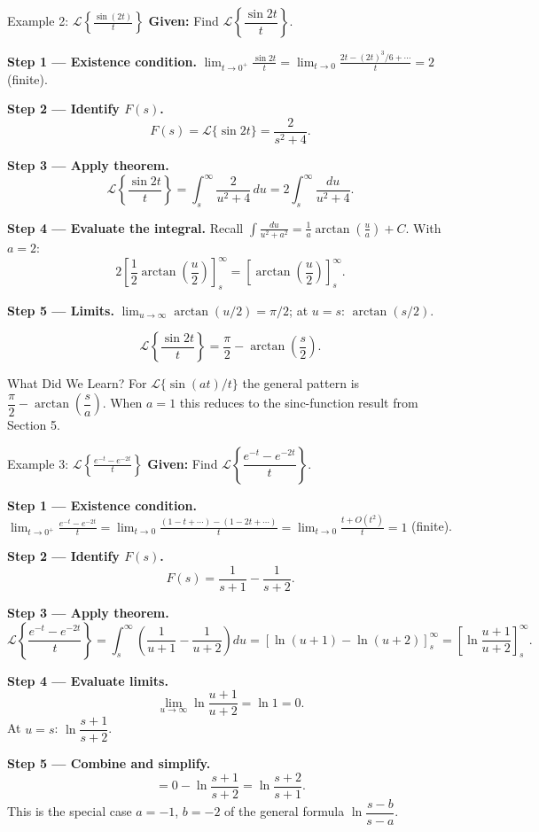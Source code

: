 \documentclass[12pt,a4paper]{article}
\begin{document}
\begin{infobox}{Example 2: $\mathcal{L}\!\left\{\frac{\sin(2t)}{t}\right\}$}
\textbf{Given:} Find $\mathcal{L}\!\left\{\dfrac{\sin 2t}{t}\right\}$.

\textbf{Step 1 --- Existence condition.}
$\displaystyle\lim_{t\to 0^+}\frac{\sin 2t}{t}
= \lim_{t\to 0}\frac{2t - (2t)^3/6 + \cdots}{t} = 2$ (finite). \checkmark

\textbf{Step 2 --- Identify $F(s)$.}
\[
  F(s) = \mathcal{L}\{\sin 2t\} = \frac{2}{s^2+4}.
\]

\textbf{Step 3 --- Apply theorem.}
\[
  \mathcal{L}\!\left\{\frac{\sin 2t}{t}\right\}
  = \int_s^\infty \frac{2}{u^2+4}\,du
  = 2\int_s^\infty \frac{du}{u^2+4}.
\]

\textbf{Step 4 --- Evaluate the integral.}
Recall $\displaystyle\int \frac{du}{u^2+a^2} = \frac{1}{a}\arctan\!\left(\frac{u}{a}\right)+C$.
With $a=2$:
\[
  2\left[\frac{1}{2}\arctan\!\left(\frac{u}{2}\right)\right]_s^\infty
  = \left[\arctan\!\left(\frac{u}{2}\right)\right]_s^\infty.
\]

\textbf{Step 5 --- Limits.}
$\lim_{u\to\infty}\arctan(u/2) = \pi/2$; at $u=s$: $\arctan(s/2)$.

\[
  \boxed{\mathcal{L}\!\left\{\frac{\sin 2t}{t}\right\}
  = \frac{\pi}{2} - \arctan\!\left(\frac{s}{2}\right).}
\]
\end{infobox}

\begin{learnbox}{What Did We Learn?}
For $\mathcal{L}\{\sin(at)/t\}$ the general pattern is
$\dfrac{\pi}{2} - \arctan\!\left(\dfrac{s}{a}\right)$.
When $a=1$ this reduces to the sinc-function result from Section 5.
\end{learnbox}

\begin{infobox}{Example 3: $\mathcal{L}\!\left\{\frac{e^{-t}-e^{-2t}}{t}\right\}$}
\textbf{Given:} Find $\mathcal{L}\!\left\{\dfrac{e^{-t}-e^{-2t}}{t}\right\}$.

\textbf{Step 1 --- Existence condition.}
$\displaystyle\lim_{t\to 0^+}\frac{e^{-t}-e^{-2t}}{t}
= \lim_{t\to 0}\frac{(1-t+\cdots)-(1-2t+\cdots)}{t}
= \lim_{t\to 0}\frac{t+O(t^2)}{t} = 1$ (finite). \checkmark

\textbf{Step 2 --- Identify $F(s)$.}
\[
  F(s) = \frac{1}{s+1} - \frac{1}{s+2}.
\]

\textbf{Step 3 --- Apply theorem.}
\[
  \mathcal{L}\!\left\{\frac{e^{-t}-e^{-2t}}{t}\right\}
  = \int_s^\infty\!\!\left(\frac{1}{u+1} - \frac{1}{u+2}\right) du
  = \left[\ln(u+1) - \ln(u+2)\right]_s^\infty
  = \left[\ln\frac{u+1}{u+2}\right]_s^\infty.
\]

\textbf{Step 4 --- Evaluate limits.}
\[
  \lim_{u\to\infty}\ln\frac{u+1}{u+2} = \ln 1 = 0.
\]
At $u=s$: $\ln\dfrac{s+1}{s+2}$.

\textbf{Step 5 --- Combine and simplify.}
\[
  = 0 - \ln\frac{s+1}{s+2} = \ln\frac{s+2}{s+1}.
\]
This is the special case $a=-1$, $b=-2$ of the general formula
$\ln\dfrac{s-b}{s-a}$.
\end{infobox}
\end{document}
